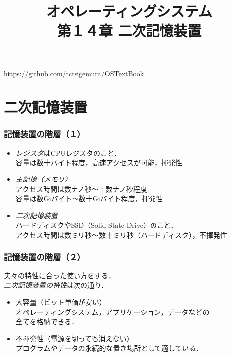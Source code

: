 \documentclass{beamer}                   %
\begin{document}
\title[主記憶]{オペレーティングシステム\\第１４章 二次記憶装置}
\date{}
\begin{frame}
  \titlepage
  \centerline{\url{https://github.com/tctsigemura/OSTextBook}}
\end{frame}


\section{二次記憶装置}
\begin{frame}
  \frametitle{記憶装置の階層（１）}
  \begin{itemize}
  \item \emph{レジスタ}はCPUレジスタのこと．\\
    容量は数十バイト程度，高速アクセスが可能，揮発性
  \item \emph{主記憶（メモリ）} \\
    アクセス時間は数ナノ秒〜十数ナノ秒程度\\
    容量は数Giバイト〜数十Giバイト程度，揮発性
  \item \emph{二次記憶装置} \\
    ハードディスクやSSD（Solid State Drive）のこと．\\
    アクセス時間は数ミリ秒〜数十ミリ秒（ハードディスク），不揮発性
\end{itemize}
\end{frame}

\begin{frame}
  \frametitle{記憶装置の階層（２）}
  夫々の特性に合った使い方をする．\\
  \emph{二次記憶装置の特性}は次の通り．
  \begin{itemize}
  \item 大容量（ビット単価が安い）\\
    オペレーティングシステム，アプリケーション，データなどの\\
    全てを格納できる．
  \item 不揮発性（電源を切っても消えない） \\
    プログラムやデータの永続的な置き場所として適している．
  \end{itemize}
  \vfill
\end{frame}
\end{document}
